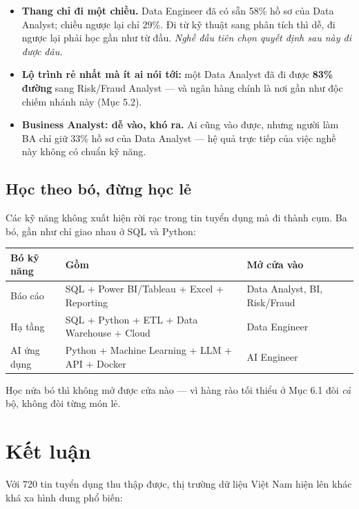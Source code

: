 \documentclass[10pt]{article}
\newcommand{\keyfind}[1]{\textbf{#1}}
\begin{document}
\begin{itemize}
\item \keyfind{Thang chỉ đi một chiều.} Data Engineer đã có sẵn 58\% hồ sơ của Data Analyst; chiều ngược
      lại chỉ 29\%. Đi từ kỹ thuật sang phân tích thì dễ, đi ngược lại phải học gần như từ đầu.
      \emph{Nghề đầu tiên chọn quyết định sau này đi được đâu.}
\item \keyfind{Lộ trình rẻ nhất mà ít ai nói tới:} một Data Analyst đã đi được \textbf{83\% đường} sang
      Risk/Fraud Analyst --- và ngân hàng chính là nơi gần như độc chiếm nhánh này (Mục 5.2).
\item \keyfind{Business Analyst: dễ vào, khó ra.} Ai cũng vào được, nhưng người làm BA chỉ giữ 33\% hồ sơ
      của Data Analyst --- hệ quả trực tiếp của việc nghề này không có chuẩn kỹ năng.
\end{itemize}

\subsection{Học theo bó, đừng học lẻ}

Các kỹ năng không xuất hiện rời rạc trong tin tuyển dụng mà đi thành cụm. Ba bó, gần như chỉ giao nhau ở
SQL và Python:

\begin{center}
\small
\begin{tabular}{lll}
\toprule
\textbf{Bó kỹ năng} & \textbf{Gồm} & \textbf{Mở cửa vào} \\
\midrule
Báo cáo    & SQL + Power BI/Tableau + Excel + Reporting     & Data Analyst, BI, Risk/Fraud \\
Hạ tầng    & SQL + Python + ETL + Data Warehouse + Cloud    & Data Engineer \\
AI ứng dụng& Python + Machine Learning + LLM + API + Docker & AI Engineer \\
\bottomrule
\end{tabular}
\end{center}

Học nửa bó thì không mở được cửa nào --- vì hàng rào tối thiểu ở Mục 6.1 đòi \emph{cả} bộ, không đòi từng
món lẻ.

\section{Kết luận}

Với 720 tin tuyển dụng thu thập được, thị trường dữ liệu Việt Nam hiện lên khác khá xa hình dung phổ biến:
\end{document}
